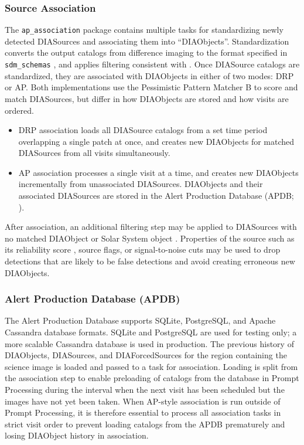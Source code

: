 

\subsubsection{Source Association}
\label{sec:association}

The \texttt{ap\_association} package contains multiple tasks for standardizing newly detected DIASources and associating them into ``DIAObjects''.
Standardization converts the output catalogs from difference imaging to the format specified in \texttt{sdm\_schemas} , and applies filtering consistent with \citet{DMTN-199}.
Once DIASource catalogs are standardized, they are associated with DIAObjects in either of two modes: DRP or AP.
Both implementations use the Pessimistic Pattern Matcher B \citep{DMTN-031} to score and match DIASources, but differ in how DIAObjects are stored and how visits are ordered.

\begin{itemize}
\item DRP association loads all DIASource catalogs from a set time period overlapping a single patch at once, and creates new DIAObjects for matched DIASources from all visits simultaneously.
\item AP association processes a single visit at a time, and creates new DIAObjects incrementally from unassociated DIASources.
DIAObjects and their associated DIASources are stored in the Alert Production Database (APDB; ).
\end{itemize}

After association, an additional filtering step may be applied to DIASources with no matched DIAObject or Solar System object .
Properties of the source such as its reliability score , source flags, or signal-to-noise cuts may be used to drop detections that are likely to be false detections and avoid creating erroneous new DIAObjects.

\subsubsection{Alert Production Database (APDB)}
\label{sec:apdb}

The Alert Production Database \citep[APDB;][]{DMTN-293} supports SQLite, PostgreSQL, and Apache Cassandra database formats.
SQLite and PostgreSQL are used for testing only; a more scalable Cassandra database is used in production.
The previous history of DIAObjects, DIASources, and DIAForcedSources for the region containing the science image is loaded and passed to a task for association.
Loading is split from the association step to enable preloading of catalogs from the database in Prompt Processing during the interval when the next visit has been scheduled but the images have not yet been taken.
When AP-style association is run outside of Prompt Processing, it is therefore essential to process all association tasks in strict visit order to prevent loading catalogs from the APDB prematurely and losing DIAObject history in association.

